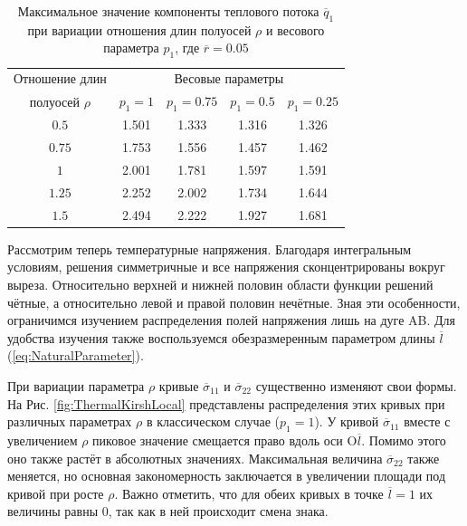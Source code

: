 \begin{table}[htbp]
    \centering
    \begin{threeparttable}%
        \caption{Максимальное значение компоненты теплового потока $\overline{q}_{1}$ при вариации отношения длин полуосей $\rho$ и весового параметра $p_1$, где $\overline{r} = 0.05$}\label{tab:MaxFlux}
        \begin{tabular}{|c|c|c|c|c|}
			\hline
			Отношение длин    & \multicolumn{4}{c|}{Весовые параметры} \\
			\cline{2-5}
			полуосей $\rho$   & $p_1 = 1$ & $p_1 = 0.75$ & $p_1 = 0.5$ & $p_1 = 0.25$ \\
			\hline
			$0.5$             & 1.501     & 1.333        & 1.316       & 1.326 \\
			\hline
			$0.75$            & 1.753     & 1.556        & 1.457       & 1.462  \\
			\hline
			$1$               & 2.001     & 1.781        & 1.597       & 1.591 \\
			\hline
			$1.25$            & 2.252     & 2.002        & 1.734       & 1.644 \\
			\hline
			$1.5$             & 2.494     & 2.222        & 1.927       & 1.681 \\
			\hline
        \end{tabular}
    \end{threeparttable}
\end{table}

Рассмотрим теперь температурные напряжения. Благодаря интегральным условиям, решения симметричные и все напряжения сконцентрированы вокруг выреза. Относительно верхней и нижней половин области функции решений чётные, а относительно левой и правой половин нечётные. Зная эти особенности, ограничимся изучением распределения полей напряжения лишь на дуге AB. Для удобства изучения также воспользуемся обезразмеренным параметром длины $\overline{l}$ (\ref{eq:NaturalParameter}).

При вариации параметра $\rho$ кривые $\overline{\sigma}_{11}$ и $\overline{\sigma}_{22}$ существенно изменяют свои формы. На Рис. \ref{fig:ThermalKirshLocal} представлены распределения этих кривых при различных параметрах $\rho$ в классическом случае ($p_1 = 1$). У кривой $\overline{\sigma}_{11}$ вместе с увеличением $\rho$ пиковое значение смещается право вдоль оси O$\overline{l}$. Помимо этого оно также растёт в абсолютных значениях. Максимальная величина $\overline{\sigma}_{22}$ также меняется, но основная закономерность заключается в увеличении площади под кривой при росте $\rho$. Важно отметить, что для обеих кривых в точке $\overline{l} = 1$ их величины равны 0, так как в ней происходит смена знака.

